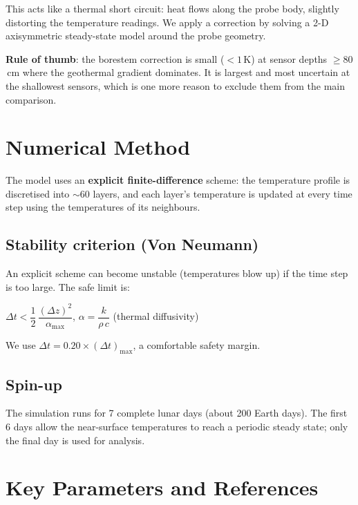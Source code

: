 \documentclass[12pt, a4paper]{article}
\newcommand{\eqbox}[1]{%
  \begin{center}
    \colorbox{boxgray}{\parbox{0.88\linewidth}{\vspace{4pt}\centering#1\vspace{4pt}}}
  \end{center}
}
\begin{document}
This acts like a thermal short circuit: heat flows along the probe body,
slightly distorting the temperature readings.  We apply a correction by
solving a 2-D axisymmetric steady-state model around the probe geometry.

\medskip
\textbf{Rule of thumb}: the borestem correction is small ($< 1$\,K) at
sensor depths $\geq 80$\,cm where the geothermal gradient dominates.  It
is largest and most uncertain at the shallowest sensors, which is one more
reason to exclude them from the main comparison.

\section{Numerical Method}

The model uses an \textbf{explicit finite-difference} scheme: the temperature
profile is discretised into $\sim$60 layers, and each layer's temperature is
updated at every time step using the temperatures of its neighbours.

\subsection{Stability criterion (Von Neumann)}

An explicit scheme can become unstable (temperatures blow up) if the time
step is too large.  The safe limit is:

\eqbox{
  $\Delta t < \dfrac{1}{2}\,\dfrac{(\Delta z)^2}{\alpha_{\max}}$,
  \quad $\alpha = \dfrac{k}{\rho\, c}$ (thermal diffusivity)
}

\noindent We use $\Delta t = 0.20 \times (\Delta t)_{\text{max}}$, a
comfortable safety margin.

\subsection{Spin-up}

The simulation runs for 7 complete lunar days (about 200 Earth days).
The first 6 days allow the near-surface temperatures to reach a
periodic steady state; only the final day is used for analysis.

\section{Key Parameters and References}
\end{document}
